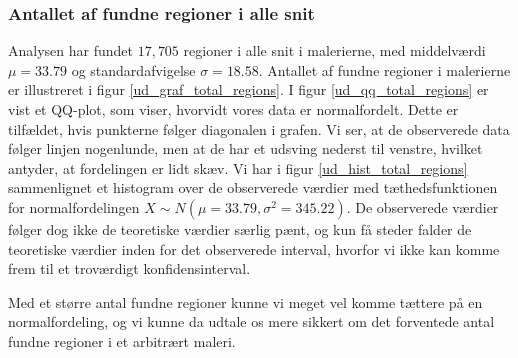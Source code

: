 {\subsubsection{Antallet af fundne regioner i alle snit}
Analysen har fundet $17,705$ regioner i alle snit i malerierne, med
middelværdi $\mu = 33.79$ og standardafvigelse $\sigma = 18.58$.
Antallet af fundne regioner i malerierne er illustreret i figur
\ref{ud_graf_total_regions}. I figur \ref{ud_qq_total_regions} er vist
et QQ-plot, som viser, hvorvidt vores data er normalfordelt. Dette er
tilfældet, hvis punkterne følger diagonalen i grafen. Vi ser, at de
observerede data følger linjen nogenlunde, men at de har et udsving nederst
til venstre, hvilket antyder, at fordelingen er lidt skæv. Vi har i figur
\ref{ud_hist_total_regions} sammenlignet et histogram over de
observerede værdier med tæthedsfunktionen for normalfordelingen $X \sim
N(\mu = 33.79, \sigma^2 = 345.22)$. De observerede værdier følger dog
ikke de teoretiske værdier særlig pænt, og kun få steder falder de
teoretiske værdier inden for det observerede interval, hvorfor vi ikke
kan komme frem til et troværdigt konfidensinterval.

Med et større antal fundne regioner kunne vi meget vel komme tættere på
en normalfordeling, og vi kunne da udtale os mere sikkert om det
forventede antal fundne regioner i et arbitrært maleri.

}
